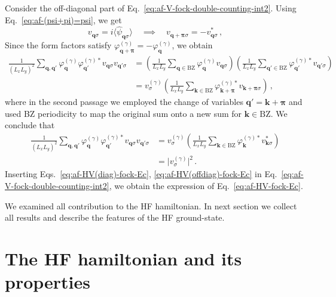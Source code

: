 \begin{tabproof}
	Consider the off-diagonal part of Eq.~\eqref{eq:af-V-fock-double-counting-int2}. Using Eq.~\eqref{eq:af-(psi+pi)=psi}, we get
	\[
	v_{\mathbf{q}\sigma} = i\langle
	\hat \psi_{\mathbf{q}\sigma}
	\rangle
	\quad\implies\quad
	v_{\mathbf{q}+\bm{\pi}\sigma} = - v_{\mathbf{q}\sigma}^* \, ,
	\]
	Since the form factors satisfy $\varphi_{\mathbf{q}+\bm{\pi}}^{(\gamma)} = -\varphi_{\mathbf{q}}^{(\gamma)}$, we obtain
	\[
	\begin{aligned}
		\frac{1}{(L_x L_y)^2} \sum_{\mathbf{q}, \mathbf{q}'} \varphi_{\mathbf{q}}^{(\gamma)} \varphi_{\mathbf{q}'}^{(\gamma)*}
		v_{\mathbf{q}\sigma} v_{\mathbf{q}'\sigma} &=
		\left(
		\frac{1}{L_x L_y} \sum_{\mathbf{q}\in\mathrm{BZ}} \varphi_{\mathbf{q}}^{(\gamma)} v_{\mathbf{q}\sigma}
		\right) \left(
		\frac{1}{L_x L_y} \sum_{\mathbf{q}'\in\mathrm{BZ}} \varphi_{\mathbf{q}'}^{(\gamma)*} v_{\mathbf{q}'\sigma}
		\right) \\
		&= v^{(\gamma)}_\sigma \left(
		\frac{1}{L_x L_y} \sum_{\mathbf{k}\in\mathrm{BZ}} \varphi_{\mathbf{k}+\bm{\pi}}^{(\gamma)*} v_{\mathbf{k}+\bm{\pi}\sigma}
		\right) \, ,
	\end{aligned}
	\]
	where in the second passage we employed the change of variables $\mathbf{q}'=\mathbf{k}+\bm{\pi}$ and used BZ periodicity to map the original sum onto a new sum for $\mathbf{k}\in\mathrm{BZ}$. We conclude that
	\begin{align}
		\frac{1}{(L_x L_y)^2} \sum_{\mathbf{q}, \mathbf{q}'} \varphi_{\mathbf{q}}^{(\gamma)} \varphi_{\mathbf{q}'}^{(\gamma)*}
		v_{\mathbf{q}\sigma} v_{\mathbf{q}'\sigma} &= v^{(\gamma)}_\sigma \left(
		\frac{1}{L_x L_y} \sum_{\mathbf{k}\in\mathrm{BZ}} \varphi_{\mathbf{k}}^{(\gamma)*} v_{\mathbf{k}\sigma}^*
		\right) \nonumber \\
		&= \big| v^{(\gamma)}_\sigma \big|^2 \label{eq:af-HV(offdiag)-fock-Ec} \, .
	\end{align}
	Inserting Eqs.~\eqref{eq:af-HV(diag)-fock-Ec}, \eqref{eq:af-HV(offdiag)-fock-Ec} in Eq.~\eqref{eq:af-V-fock-double-counting-int2}, we obtain the expression of Eq.~\eqref{eq:af-HV-fock-Ec}.
\end{tabproof}
%
We examined all contribution to the HF hamiltonian. In next section we collect all results and describe the features of the HF ground-state.

\section{The HF hamiltonian and its properties}\label{sec:af-hf-hamiltonian}

